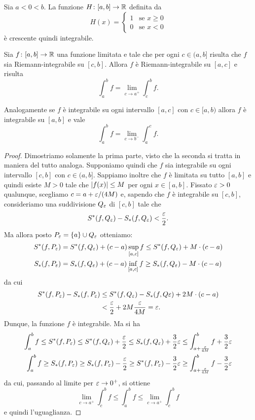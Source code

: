 \begin{example}
\label{ex:heaviside}
Sia $a<0<b$.
La funzione $H\colon [a,b] \to \mathbb R$ definita da
\[
H(x) =
\begin{cases}
1 & \text{se $x\ge 0$}\\
0 & \text{se $x< 0$}
\end{cases}
\]
è crescente quindi integrabile.
\end{example}

\begin{theorem}
\label{th:integrale_continuo}
Sia $f\colon [a,b]\to \mathbb R$ una funzione limitata e tale
che per ogni $c\in (a,b]$ risulta che $f$ sia Riemann-integrabile
su $[c,b]$. Allora $f$ è Riemann-integrabile su $[a,c]$ e risulta
\[
  \int_a^b f = \lim_{c\to a^+} \int_c^b f.
\]

Analogamente se $f$ è integrabile su ogni intervallo $[a,c]$
con $c\in [a,b)$ allora $f$ è integrabile su $[a,b]$ e vale
\[
  \int_a^b f = \lim_{c\to b^-} \int_a^c f.
\]
\end{theorem}
%
\begin{proof}
Dimostriamo solamente la prima parte, visto che la seconda si tratta in
maniera del tutto analoga. Supponiamo quindi che $f$ sia integrabile su ogni
intervallo $[c,b]$ con $c\in (a,b]$. Sappiamo inoltre che $f$ è limitata su
tutto $[a,b]$ e quindi esiste $M>0$ tale che ${\left|f(x)\right|}\le M$ per ogni
$x\in [a,b]$. Fissato $\varepsilon>0$ qualunque,
scegliamo $c = a + \varepsilon/(4M)$ e, sapendo che $f$ è integrabile su $[c,b]$,
consideriamo una suddivisione $Q_\varepsilon$ di $[c,b]$ tale che
\[
  S^*(f, Q_\varepsilon) - S_*(f, Q_\varepsilon) < \frac {\varepsilon} 2.
\]
Ma allora posto $P_\varepsilon = \{a\} \cup Q_\varepsilon$ otteniamo:
\begin{align*}
  S^*(f,P_\varepsilon) &= S^*(f,Q_\varepsilon) + (c-a)\sup_{[a,c]} f
    \le S^*(f,Q_\varepsilon) + M \cdot (c-a)\\
  S_*(f,P_\varepsilon) &= S_*(f,Q_\varepsilon) + (c-a)\inf_{[a,c]} f
    \ge S_*(f,Q_\varepsilon) - M \cdot (c-a)
\end{align*}
da cui
\begin{align*}
 S^*(f,P_\varepsilon)-S_*(f,P_\varepsilon)
 &\le S^*(f,Q_\varepsilon) - S_*(f,Q\varepsilon) + 2 M \cdot (c-a)\\
 &< \frac{\varepsilon}{2} + 2 M \frac{\varepsilon}{4M}
 = \varepsilon.
\end{align*}
Dunque, la funzione $f$ è integrabile. Ma si ha
\begin{align*}
\int_a^b f \le S^*(f,P_\varepsilon) \le S^*(f,Q_\varepsilon) + \frac{\varepsilon}{2}
\le S_*(f,Q_\varepsilon) + \frac 3 2 \varepsilon
\le \int_{a+\frac {\varepsilon}{4M}}^b f + \frac {3}{2} \varepsilon \\
\int_a^b f \ge S_*(f,P_\varepsilon) \ge S_*(f,P_\varepsilon) - \frac{\varepsilon}{2}
\ge S^*(f,P_\varepsilon) - \frac 3 2 \varepsilon
\ge \int_{a+\frac {\varepsilon}{4M}}^b f - \frac {3}{2} \varepsilon
\end{align*}
da cui, passando al limite per $\varepsilon \to 0^+$, si ottiene
\[
  \lim_{c\to a^+} \int_c^b f \le \int_a^b f \le \lim_{c\to a^+} \int_c^b f
\]
e quindi l'uguaglianza.
\end{proof}

